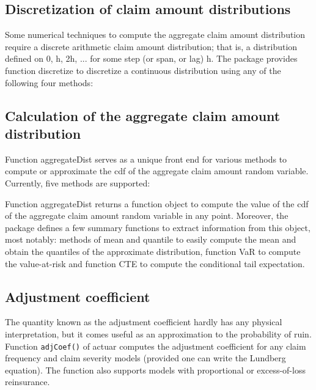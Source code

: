 \documentclass[12pt]{article}
\begin{document}
\subsection{Discretization of claim amount distributions}

Some numerical techniques to compute the aggregate claim amount distribution require a discrete arithmetic claim amount distribution; that is, a distribution defined on 0, h, 2h, ... for some step (or span, or lag) h. The package provides function discretize to discretize a continuous distribution using any of the following four methods:

\subsection{Calculation of the aggregate claim amount distribution}

Function aggregateDist serves as a unique front end for various methods to compute or approximate the cdf of the aggregate claim amount random variable. Currently, five methods are supported:

Function aggregateDist returns a function object to compute the value of the cdf of the aggregate claim amount random variable in any point. Moreover, the package defines a few summary functions to extract information from this object, most notably: methods of mean and quantile to easily compute the mean and obtain the quantiles of the approximate distribution, function VaR to compute the value-at-risk and function CTE to compute the conditional tail expectation.

\subsection{Adjustment coefficient}

The quantity known as the adjustment coefficient hardly has any physical interpretation, but it comes useful as an approximation to the probability of ruin. Function \texttt{adjCoef()} of actuar computes the adjustment coefficient for any claim frequency and claim severity models (provided one can write the Lundberg equation). The function also supports models with proportional or excess-of-loss reinsurance.
\end{document}
